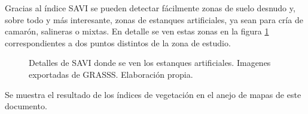 Gracias al índice \ac{SAVI} se pueden detectar fácilmente zonas de suelo desnudo y, sobre todo y más interesante, zonas de estanques artificiales, ya sean para cría de camarón, salineras o mixtas. En detalle se ven estas zonas en la figura \ref{fig:detalle_estanques} correspondientes a dos puntos distintos de la zona de estudio.%

\begin{figure}
	\centering
	\caption[Detalle de estanques en SAVI]{Detalles de SAVI donde se ven los estanques artificiales. Imagenes exportadas de GRASSS. Elaboración propia.}
	\label{fig:detalle_estanques}
\end{figure}

Se muestra el resultado de los índices de vegetación en el anejo de mapas de este documento.